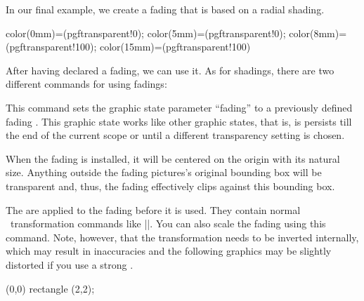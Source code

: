 \begin{command}{\pgfdeclarefading{}}
  In our final example, we create a fading that is based on a radial
  shading.
\begin{codeexample}[]
{
  color(0mm)=(pgftransparent!0);
  color(5mm)=(pgftransparent!0);
  color(8mm)=(pgftransparent!100);
  color(15mm)=(pgftransparent!100)
}
\end{codeexample}
\end{command}

After having declared a fading, we can use it. As for shadings, there
are two different commands for using fadings:

\begin{command}{\pgfsetfading{}}
  This command sets the graphic state parameter ``fading'' to a
  previously defined fading . This graphic state works like
  other graphic states, that is, is persists till the end of the
  current scope or until a different transparency setting is chosen.

  When the fading is installed, it will be centered on the origin with
  its natural size. Anything outside the fading pictures's original
  bounding box will be transparent and, thus, the fading effectively
  clips against this bounding box.

  The  are applied to the fading before it is
  used. They contain normal \pgfname\ transformation commands like
  |\pgftransformshift|. You can also scale the fading using this
  command. Note, however, that the transformation needs to be inverted
  internally, which may result in inaccuracies and the following
  graphics may be slightly distorted if you use a strong
  .
\begin{codeexample}[]
{\tikz \shade[left color=pgftransparent!0,
              right color=pgftransparent!100] (0,0) rectangle (2,2);}    
\end{codeexample}
\begin{codeexample}[]
\end{codeexample}
\end{command}

